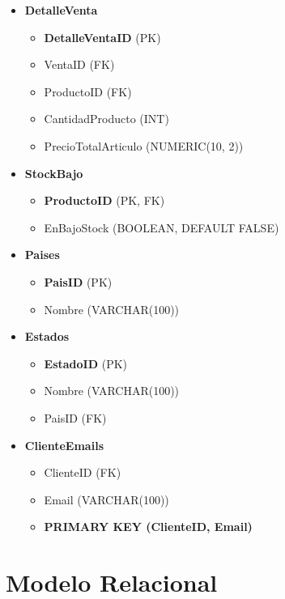 \documentclass[10pt,openany]{book}
\begin{document}
\begin{itemize}
    \item \textbf{DetalleVenta}
        \begin{itemize}
            \item \textbf{DetalleVentaID} (PK)
            \item VentaID (FK)
            \item ProductoID (FK)
            \item CantidadProducto (INT)
            \item PrecioTotalArticulo (NUMERIC(10, 2))
        \end{itemize}
        
    \item \textbf{StockBajo}
        \begin{itemize}
            \item \textbf{ProductoID} (PK, FK)
            \item EnBajoStock (BOOLEAN, DEFAULT FALSE)
        \end{itemize}
        
    \item \textbf{Paises}
        \begin{itemize}
            \item \textbf{PaisID} (PK)
            \item Nombre (VARCHAR(100))
        \end{itemize}
        
    \item \textbf{Estados}
        \begin{itemize}
            \item \textbf{EstadoID} (PK)
            \item Nombre (VARCHAR(100))
            \item PaisID (FK)
        \end{itemize}
        
    \item \textbf{ClienteEmails}
        \begin{itemize}
            \item ClienteID (FK)
            \item Email (VARCHAR(100))
            \item \textbf{PRIMARY KEY (ClienteID, Email)}
        \end{itemize}
\end{itemize}

\section{Modelo Relacional}
\end{document}

